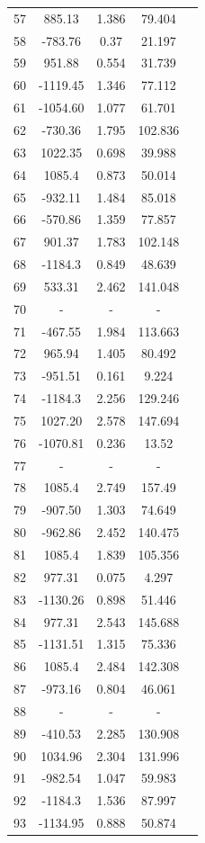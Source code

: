 {\begin{longtable}{ccccc}
57 & 885.13 & 1.386 & 79.404 \\
58 & -783.76 & 0.37 & 21.197 \\
59 & 951.88 & 0.554 & 31.739 \\
60 & -1119.45 & 1.346 & 77.112 \\
61 & -1054.60 & 1.077 & 61.701 \\
62 & -730.36 & 1.795 & 102.836 \\
63 & 1022.35 & 0.698 & 39.988 \\
64 & 1085.4 & 0.873 & 50.014 \\
65 & -932.11 & 1.484 & 85.018 \\
66 & -570.86 & 1.359 & 77.857 \\
67 & 901.37 & 1.783 & 102.148 \\
68 & -1184.3 & 0.849 & 48.639 \\
69 & 533.31 & 2.462 & 141.048 \\
70 & - & - & - \\
71 & -467.55 & 1.984 & 113.663 \\
72 & 965.94 & 1.405 & 80.492 \\
73 & -951.51 & 0.161 & 9.224 \\
74 & -1184.3 & 2.256 & 129.246 \\
75 & 1027.20 & 2.578 & 147.694 \\
76 & -1070.81 & 0.236 & 13.52 \\
77 & - & - & - \\
78 & 1085.4 & 2.749 & 157.49 \\
79 & -907.50 & 1.303 & 74.649 \\
80 & -962.86 & 2.452 & 140.475 \\
81 & 1085.4 & 1.839 & 105.356 \\
82 & 977.31 & 0.075 & 4.297 \\
83 & -1130.26 & 0.898 & 51.446 \\
84 & 977.31 & 2.543 & 145.688 \\
85 & -1131.51 & 1.315 & 75.336 \\
86 & 1085.4 & 2.484 & 142.308 \\
87 & -973.16 & 0.804 & 46.061 \\
88 & - & - & - \\
89 & -410.53 & 2.285 & 130.908 \\
90 & 1034.96 & 2.304 & 131.996 \\
91 & -982.54 & 1.047 & 59.983 \\
92 & -1184.3 & 1.536 & 87.997 \\
93 & -1134.95 & 0.888 & 50.874 \\

\end{longtable}}
